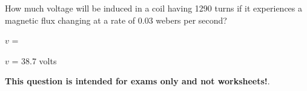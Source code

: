 

How much voltage will be induced in a coil having 1290 turns if it experiences a magnetic flux changing at a rate of 0.03 webers per second?

\vskip 10pt

$v$ = 







$v$ = 38.7 volts







{\bf This question is intended for exams only and not worksheets!}.



